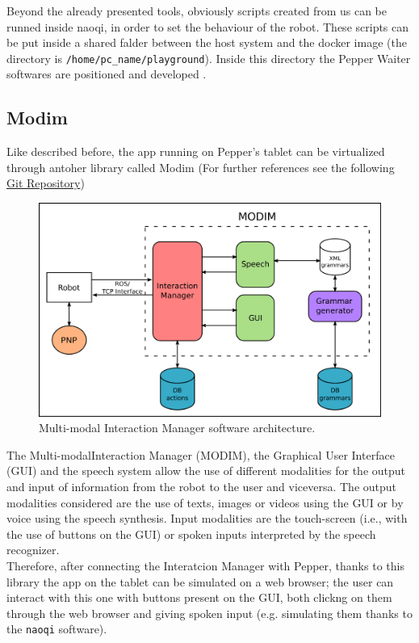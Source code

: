 \documentclass[12pt, letterpaper, twoside]{article}
\begin{document}
Beyond the already presented tools, obviously scripts created from us can be runned inside naoqi, in order to set the behaviour of the robot. These scripts can be put inside a shared falder between the host system and the docker image (the directory is \verb|/home/pc_name/playground|). Inside this directory the Pepper Waiter softwares are positioned and developed .

\subsection{Modim}
Like described before, the app running on Pepper's tablet can be virtualized through antoher library called Modim (For further references see the following \href{https://bitbucket.org/mtlazaro/modim.git}{Git Repository})\\

\begin{figure}[htbp]
	\centerline{\includegraphics[scale=.6]{img/modim.png}}
	\caption{ Multi-modal Interaction Manager software architecture.}
	\label{fig}
\end{figure}

The Multi-modalInteraction Manager (MODIM), the Graphical User Interface (GUI) and the speech system allow the use of different modalities for the output and input of information from the robot to the user and viceversa. The output modalities considered are the use of texts, images or videos using the GUI or by voice using the speech synthesis. Input modalities are the touch-screen (i.e., with the use of buttons on the GUI) or spoken inputs interpreted by the speech recognizer.\\

Therefore, after connecting the Interatcion Manager with Pepper, thanks to this library the app on the tablet can be simulated on a web browser; the user can interact with this one with buttons present on the GUI, both clickng on them through the web browser and giving spoken input (e.g. simulating them thanks to the \verb|naoqi| software).
\end{document}
